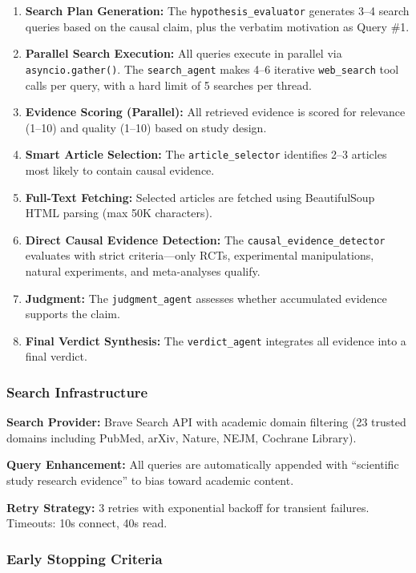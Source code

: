 \begin{enumerate}[noitemsep]
    \item \textbf{Search Plan Generation:} The \texttt{hypothesis\_evaluator} generates 3--4 search queries based on the causal claim, plus the verbatim motivation as Query \#1.
    \item \textbf{Parallel Search Execution:} All queries execute in parallel via \texttt{asyncio.gather()}. The \texttt{search\_agent} makes 4--6 iterative \texttt{web\_search} tool calls per query, with a hard limit of 5 searches per thread.
    \item \textbf{Evidence Scoring (Parallel):} All retrieved evidence is scored for relevance (1--10) and quality (1--10) based on study design.
    \item \textbf{Smart Article Selection:} The \texttt{article\_selector} identifies 2--3 articles most likely to contain causal evidence.
    \item \textbf{Full-Text Fetching:} Selected articles are fetched using BeautifulSoup HTML parsing (max 50K characters).
    \item \textbf{Direct Causal Evidence Detection:} The \texttt{causal\_evidence\_detector} evaluates with strict criteria---only RCTs, experimental manipulations, natural experiments, and meta-analyses qualify.
    \item \textbf{Judgment:} The \texttt{judgment\_agent} assesses whether accumulated evidence supports the claim.
    \item \textbf{Final Verdict Synthesis:} The \texttt{verdict\_agent} integrates all evidence into a final verdict.
\end{enumerate}

\subsubsection{Search Infrastructure}

\textbf{Search Provider:} Brave Search API with academic domain filtering (23 trusted domains including PubMed, arXiv, Nature, NEJM, Cochrane Library).

\textbf{Query Enhancement:} All queries are automatically appended with ``scientific study research evidence'' to bias toward academic content.

\textbf{Retry Strategy:} 3 retries with exponential backoff for transient failures. Timeouts: 10s connect, 40s read.

\subsubsection{Early Stopping Criteria}

